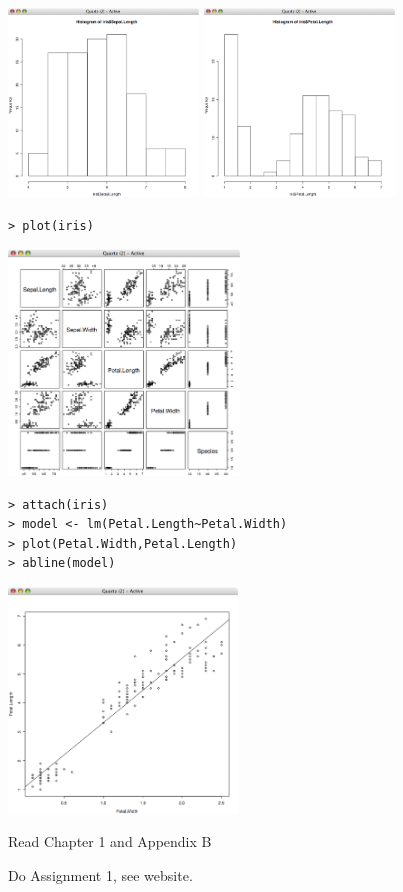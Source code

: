 \documentclass[a4paper,blends,pdf,colorBG,slideColor]{prosper}
\begin{document}
\begin{center}
   \includegraphics[height=50mm]{figures/sepal-length.eps}
   \includegraphics[height=50mm]{figures/petal-length.eps}
\end{center}
\es

\begin{verbatim}
> plot(iris)
\end{verbatim}
\begin{center}
   \includegraphics[height=60mm]{figures/iris-scatter.eps}
\end{center}
\es

{\scriptsize
\begin{verbatim}
> attach(iris)
> model <- lm(Petal.Length~Petal.Width)
> plot(Petal.Width,Petal.Length)
> abline(model)
\end{verbatim}
}
\begin{center}
   \includegraphics[height=60mm]{figures/iris-model.eps}
\end{center}

\es

Read Chapter 1 and Appendix B

Do Assignment 1, see website.
\es
\end{document}
